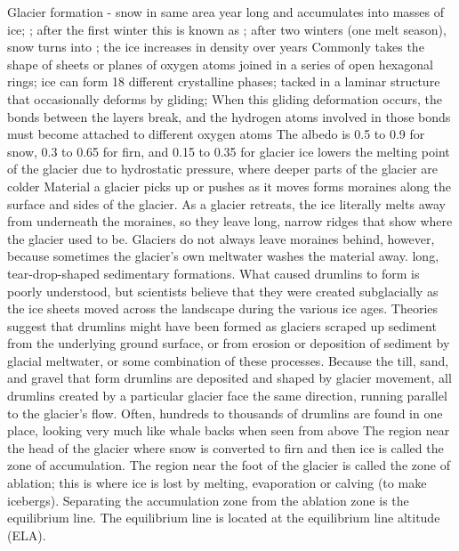 		Glacier formation - snow in same area year long and accumulates into masses of ice; ; after the first winter this is known as ; after two winters (one melt season), snow turns into ; the ice increases in density over years
		Commonly takes the shape of sheets or planes of oxygen atoms joined in a series of open hexagonal rings; ice can form 18 different crystalline phases; tacked in a laminar structure that occasionally deforms by gliding; When this gliding deformation occurs, the bonds between the layers break, and the hydrogen atoms involved in those bonds must become attached to different oxygen atoms
		 The albedo is 0.5 to 0.9 for snow, 0.3 to 0.65 for firn, and 0.15 to 0.35 for glacier ice
		 lowers the melting point of the glacier due to hydrostatic pressure, where deeper parts of the glacier are colder
		Material a glacier picks up or pushes as it moves forms moraines along the surface and sides of the glacier. As a glacier retreats, the ice literally melts away from underneath the moraines, so they leave long, narrow ridges that show where the glacier used to be. Glaciers do not always leave moraines behind, however, because sometimes the glacier’s own meltwater washes the material away.
		 long, tear-drop-shaped sedimentary formations. What caused drumlins to form is poorly understood, but scientists believe that they were created subglacially as the ice sheets moved across the landscape during the various ice ages. Theories suggest that drumlins might have been formed as glaciers scraped up sediment from the underlying ground surface, or from erosion or deposition of sediment by glacial meltwater, or some combination of these processes. Because the till, sand, and gravel that form drumlins are deposited and shaped by glacier movement, all drumlins created by a particular glacier face the same direction, running parallel to the glacier's flow. Often, hundreds to thousands of drumlins are found in one place, looking very much like whale backs when seen from above
		The region near the head of the glacier where snow is converted to firn and then ice is called the zone of accumulation.  The region near the foot of the glacier is called the zone of ablation; this is where ice is lost by melting, evaporation or calving (to make icebergs).  Separating the accumulation zone from the ablation zone is the equilibrium line. The equilibrium line is located at the equilibrium line altitude (ELA).
